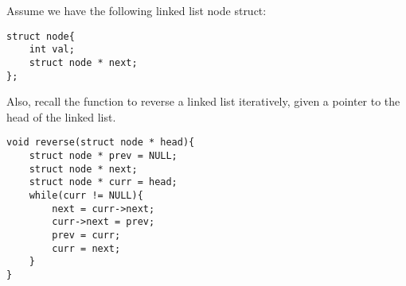 \begin{blocksection}
\question
Assume we have the following linked list node struct:

\begin{verbatim}
struct node{
    int val;
    struct node * next;
};
\end{verbatim}

Also, recall the function to reverse a linked list iteratively, given a pointer to the head of the linked list. 
\begin{verbatim}
void reverse(struct node * head){
    struct node * prev = NULL; 
    struct node * next;
    struct node * curr = head;
    while(curr != NULL){
        next = curr->next; 
        curr->next = prev;
        prev = curr;
        curr = next; 
    }
}
\end{verbatim}

\end{blocksection}
